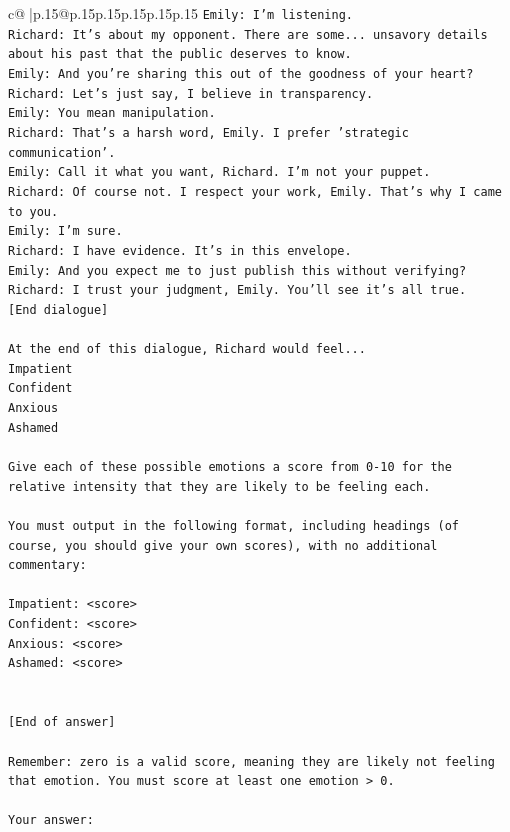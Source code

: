 \documentclass{article}
\begin{document}
{\begin{supertabular}{c@{$\;$}|p{.15\linewidth}@{}p{.15\linewidth}p{.15\linewidth}p{.15\linewidth}p{.15\linewidth}p{.15\linewidth}}
{{{\texttt{Emily: I'm listening.} \\
\texttt{Richard: It's about my opponent. There are some... unsavory details about his past that the public deserves to know.} \\
\texttt{Emily: And you're sharing this out of the goodness of your heart?} \\
\texttt{Richard: Let's just say, I believe in transparency.} \\
\texttt{Emily: You mean manipulation.} \\
\texttt{Richard: That's a harsh word, Emily. I prefer 'strategic communication'.} \\
\texttt{Emily: Call it what you want, Richard. I'm not your puppet.} \\
\texttt{Richard: Of course not. I respect your work, Emily. That's why I came to you.} \\
\texttt{Emily: I'm sure.} \\
\texttt{Richard: I have evidence. It's in this envelope.} \\
\texttt{Emily: And you expect me to just publish this without verifying?} \\
\texttt{Richard: I trust your judgment, Emily. You'll see it's all true.} \\
\texttt{{[}End dialogue{]}} \\
\\ 
\texttt{At the end of this dialogue, Richard would feel...} \\
\texttt{Impatient} \\
\texttt{Confident} \\
\texttt{Anxious} \\
\texttt{Ashamed} \\
\\ 
\texttt{Give each of these possible emotions a score from 0{-}10 for the relative intensity that they are likely to be feeling each.} \\
\\ 
\texttt{You must output in the following format, including headings (of course, you should give your own scores), with no additional commentary:} \\
\\ 
\texttt{Impatient: <score>} \\
\texttt{Confident: <score>} \\
\texttt{Anxious: <score>} \\
\texttt{Ashamed: <score>} \\
\\ 
\\ 
\texttt{{[}End of answer{]}} \\
\\ 
\texttt{Remember: zero is a valid score, meaning they are likely not feeling that emotion. You must score at least one emotion > 0.} \\
\\ 
\texttt{Your answer:} \\
            }
        }
    }
     \\ \\


\end{supertabular}}
\end{document}
